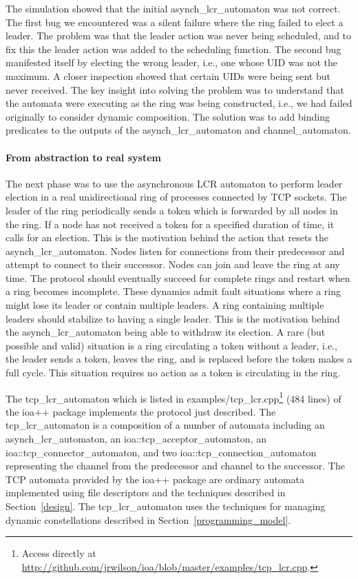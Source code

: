 The simulation showed that the initial asynch\_lcr\_automaton was not correct.
The first bug we encountered was a silent failure where the ring failed to elect a leader.
The problem was that the leader action was never being scheduled, and to fix this the leader action was added to the scheduling function.
The second bug manifested itself by electing the wrong leader, i.e., one whose UID was not the maximum.
A closer inspection showed that certain UIDs were being sent but never received.
The key insight into solving the problem was to understand that the automata were executing as the ring was being constructed, i.e., we had failed originally to consider dynamic composition.
The solution was to add binding predicates to the outputs of the asynch\_lcr\_automaton and channel\_automaton.

\paragraph*{From abstraction to real system}
The next phase was to use the asynchronous LCR automaton to perform leader election in a real unidirectional ring of processes connected by TCP sockets.
The leader of the ring periodically sends a token which is forwarded by all nodes in the ring.
If a node has not received a token for a specified duration of time, it calls for an election.
This is the motivation behind the action that resets the asynch\_lcr\_automaton.
Nodes listen for connections from their predecessor and attempt to connect to their successor.
Nodes can join and leave the ring at any time.
The protocol should eventually succeed for complete rings and restart when a ring becomes incomplete.
These dynamics admit fault situations where a ring might lose its leader or contain multiple leaders.
A ring containing multiple leaders should stabilize to having a single leader.
This is the motivation behind the asynch\_lcr\_automaton being able to withdraw its election.
A rare (but possible and valid) situation is a ring circulating a token without a leader, i.e., the leader sends a token, leaves the ring, and is replaced before the token makes a full cycle.
This situation requires no action as a token is circulating in the ring.

The tcp\_lcr\_automaton which is listed in examples/tcp\_lcr.cpp\footnote{Access directly at \url{http://github.com/jrwilson/ioa/blob/master/examples/tcp_lcr.cpp}.} (484 lines) of the ioa++ package implements the protocol just described.
The tcp\_lcr\_automaton is a composition of a number of automata including an asynch\_lcr\_automaton, an ioa::tcp\_acceptor\_automaton, an ioa::tcp\_connector\_automaton, and two ioa::tcp\_connection\_automaton representing the channel from the predecessor and channel to the successor.
The TCP automata provided by the ioa++ package are ordinary automata implemented using file descriptors and the techniques described in Section~\ref{design}.
The tcp\_lcr\_automaton uses the techniques for managing dynamic constellations described in Section~\ref{programming_model}.

